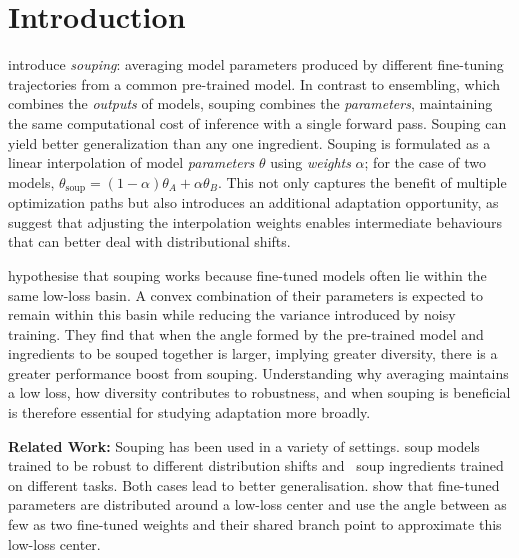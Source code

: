 \section{Introduction}



\citet{soups} introduce \emph{souping}: averaging model parameters produced by different fine-tuning trajectories from a common pre-trained model. In contrast to ensembling, which combines the \textit{outputs} of models, souping combines the \textit{parameters}, maintaining the same computational cost of inference with a single forward pass. Souping can yield better generalization than any one ingredient. Souping is formulated as a linear interpolation of model \textit{parameters} $\theta$ using \textit{weights} $\alpha$; for the case of two models, $\theta_\text{soup} = (1-\alpha)\theta_A + \alpha \theta_B$. This not only captures the benefit of multiple optimization paths but also introduces an additional adaptation opportunity, as \citet{seasoningsoups} suggest that adjusting the interpolation weights enables intermediate behaviours that can better deal with distributional shifts.

\citet{soups} hypothesise that souping works because fine-tuned models often lie within the same low-loss basin. A convex combination of their parameters is expected to remain within this basin while reducing the variance introduced by noisy training. They find that when the angle formed by the pre-trained model and ingredients to be souped together is larger, implying greater diversity, there is a greater performance boost from souping. Understanding why averaging maintains a low loss, how diversity contributes to robustness, and when souping is beneficial is therefore essential for studying adaptation more broadly. 


\textbf{Related Work:} Souping has been used in a variety of settings. \citet{seasoningsoups} soup models trained to be robust to different distribution shifts and~\citet{ratatouille} soup ingredients trained on different tasks. Both cases lead to better generalisation. \citet{modelstock} show that fine-tuned parameters are distributed around a low-loss center and use the angle between as few as two fine-tuned weights and their shared branch point to approximate this low-loss center.

